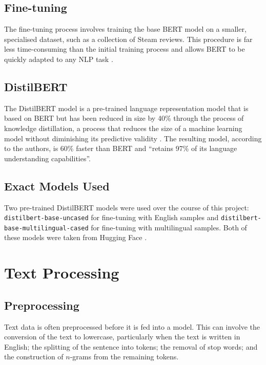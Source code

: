\subsection{Fine-tuning} \label{sec:TBG_BERT_FT}

The fine-tuning process involves training the base BERT model on a smaller, specialised dataset, such as a collection of Steam reviews. This procedure is far less time-consuming than the initial training process and allows BERT to be quickly adapted to any NLP task \cite{Devlin2018_BERT}.

\subsection{DistilBERT} \label{sec:TBG_BERT_Distil}

The DistilBERT model \cite{sanh2019distilbert} is a pre-trained language representation model that is based on BERT but has been reduced in size by 40\% through the process of knowledge distillation, a process that reduces the size of a machine learning model without diminishing its predictive validity \cite{hinton2015distilling}. The resulting model, according to the authors, is 60\% faster than BERT and ``retains 97\% of its language understanding capabilities''.

\subsection{Exact Models Used} \label{sec:TBG_BERT_Models}

Two pre-trained DistilBERT models were used over the course of this project: \texttt{distilbert-base-uncased} \cite{HuggingFaceEng} for fine-tuning with English samples and \texttt{distilbert-base-multilingual-cased} \cite{HuggingFaceMulti} for fine-tuning with multilingual samples. Both of these models were taken from Hugging Face \cite{wolf2019huggingface}. 

\section{Text Processing} \label{sec:TBG_Text}

\subsection{Preprocessing} \label{sec:TBG_Text_Pre}

Text data is often preprocessed before it is fed into a model. This can involve the conversion of the text to lowercase, particularly when the text is written in English; the splitting of the sentence into tokens; the removal of stop words; and the construction of $n$-grams from the remaining tokens.

